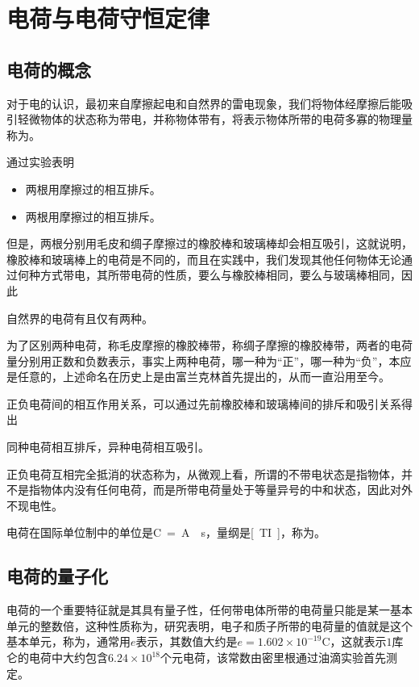 \section{电荷与电荷守恒定律}

\subsection{电荷的概念}
对于电的认识，最初来自摩擦起电和自然界的雷电现象，我们将物体经摩擦后能吸引轻微物体的状态称为带电，并称物体带有，将表示物体所带的电荷多寡的物理量称为。

通过实验表明
\begin{itemize}
    \item 两根用摩擦过的相互排斥。
    \item 两根用摩擦过的相互排斥。
\end{itemize}
但是，两根分别用毛皮和绸子摩擦过的橡胶棒和玻璃棒却会相互吸引，这就说明，橡胶棒和玻璃棒上的电荷是不同的，而且在实践中，我们发现其他任何物体无论通过何种方式带电，其所带电荷的性质，要么与橡胶棒相同，要么与玻璃棒相同，因此
\begin{center}
    自然界的电荷有且仅有两种。
\end{center}
为了区别两种电荷，称毛皮摩擦的橡胶棒带，称绸子摩擦的橡胶棒带，两者的电荷量分别用正数和负数表示，事实上两种电荷，哪一种为“正”，哪一种为“负”，本应是任意的，上述命名在历史上是由富兰克林首先提出的，从而一直沿用至今。

正负电荷间的相互作用关系，可以通过先前橡胶棒和玻璃棒间的排斥和吸引关系得出
\begin{center}
    同种电荷相互排斥，异种电荷相互吸引。
\end{center}
正负电荷互相完全抵消的状态称为，从微观上看，所谓的不带电状态是指物体，并不是指物体内没有任何电荷，而是所带电荷量处于等量异号的中和状态，因此对外不现电性。

电荷在国际单位制中的单位是\si{C=A\cdot s}，量纲是\si{[TI]}，称为。

\subsection{电荷的量子化}
电荷的一个重要特征就是其具有量子性，任何带电体所带的电荷量只能是某一基本单元的整数倍，这种性质称为，研究表明，电子和质子所带的电荷量的值就是这个基本单元，称为，通常用$e$表示，其数值大约是$e=1.602\times 10^{-19}$\si{C}，这就表示$1$库仑的电荷中大约包含$6.24\times 10^{18}$个元电荷，该常数由密里根通过油滴实验首先测定。

